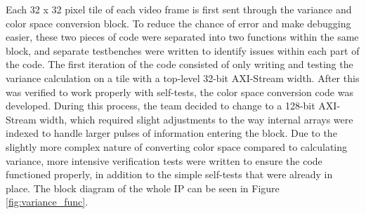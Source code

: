 \documentclass{article}
\begin{document}
                    \par Each 32 x 32 pixel tile of each video frame is first sent through the variance and color space conversion block. To reduce the chance of error and make debugging easier, these two pieces of code were separated into two functions within the same block, and separate testbenches were written to identify issues within each part of the code. The first iteration of the code consisted of only writing and testing the variance calculation on a tile with a top-level 32-bit AXI-Stream width. After this was verified to work properly with self-tests, the color space conversion code was developed. During this process, the team decided to change to a 128-bit AXI-Stream width, which required slight adjustments to the way internal arrays were indexed to handle larger pulses of information entering the block. Due to the slightly more complex nature of converting color space compared to calculating variance, more intensive verification tests were written to ensure the code functioned properly, in addition to the simple self-tests that were already in place. The block diagram of the whole IP can be seen in Figure \ref{fig:variance_func}.
\end{document}
